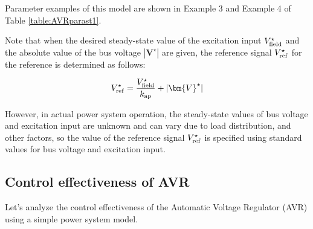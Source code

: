 \documentclass[graybox, envcountchap]{svmult}
\begin{document}
Parameter examples of this model are shown in Example 3 and Example 4 of Table
\ref{table:AVRparast1}.

Note that when the desired steady-state value of the excitation input $V_{{\rm
field}}^{\star}$ and the absolute value of the bus voltage
$\left|\bm{V}^{\star}\right|$ are given, the reference signal $V_{{\rm
ref}}^{\star}$ for the reference is determined as follows:

\begin{equation}\label{eq:avrref}
  V_{{\rm ref}}^{\star} = \frac{V_{{\rm field}}^{\star}}{k_{{\rm ap}}}+|\bm{V}^{\star}|
\end{equation}

However, in actual power system operation, the steady-state values of bus
voltage and excitation input are unknown and can vary due to load distribution,
and other factors, so the value of the reference signal $V_{{\rm ref}}^{\star}$
is specified using standard values for bus voltage and excitation input.

\subsection{Control effectiveness of AVR}

Let's analyze the control effectiveness of the Automatic Voltage Regulator (AVR)
using a simple power system model.
\end{document}
